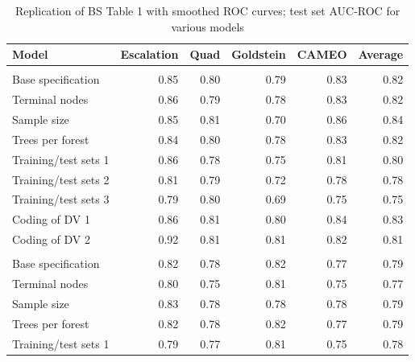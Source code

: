 \documentclass[]{article}
\begin{document}
\begin{table}[t]

\caption{\label{tab:table1-smooth}Replication of BS Table 1 with smoothed ROC curves; test set AUC-ROC for various models}
\centering
\begin{tabular}{lrrrrr}
\toprule
Model & Escalation & Quad & Goldstein & CAMEO & Average\\
\midrule
\addlinespace[0.3em]
\multicolumn{6}{l}{\textbf{One-month forecasts}}\\
\hspace{1em}Base specification & 0.85 & 0.80 & 0.79 & 0.83 & 0.82\\
\hspace{1em}Terminal nodes & 0.86 & 0.79 & 0.78 & 0.83 & 0.82\\
\hspace{1em}Sample size & 0.85 & 0.81 & 0.70 & 0.86 & 0.84\\
\hspace{1em}Trees per forest & 0.84 & 0.80 & 0.78 & 0.83 & 0.82\\
\hspace{1em}Training/test sets 1 & 0.86 & 0.78 & 0.75 & 0.81 & 0.80\\
\hspace{1em}Training/test sets 2 & 0.81 & 0.79 & 0.72 & 0.78 & 0.78\\
\hspace{1em}Training/test sets 3 & 0.79 & 0.80 & 0.69 & 0.75 & 0.75\\
\hspace{1em}Coding of DV 1 & 0.86 & 0.81 & 0.80 & 0.84 & 0.83\\
\hspace{1em}Coding of DV 2 & 0.92 & 0.81 & 0.81 & 0.82 & 0.81\\
\addlinespace[0.3em]
\multicolumn{6}{l}{\textbf{Six-month forecasts}}\\
\hspace{1em}Base specification & 0.82 & 0.78 & 0.82 & 0.77 & 0.79\\
\hspace{1em}Terminal nodes & 0.80 & 0.75 & 0.81 & 0.75 & 0.77\\
\hspace{1em}Sample size & 0.83 & 0.78 & 0.78 & 0.78 & 0.79\\
\hspace{1em}Trees per forest & 0.82 & 0.78 & 0.82 & 0.77 & 0.79\\
\hspace{1em}Training/test sets 1 & 0.79 & 0.77 & 0.81 & 0.75 & 0.78\\

\end{tabular}
\end{table}
\end{document}

